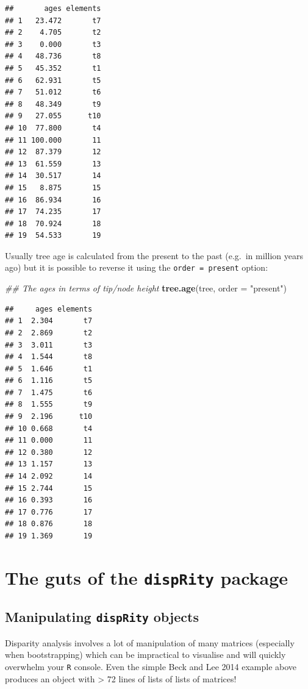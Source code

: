 \documentclass[]{book}
\newenvironment{Shaded}{\begin{snugshade}}{\end{snugshade}}
\newcommand{\CommentTok}[1]{\textcolor[rgb]{0.56,0.35,0.01}{\textit{#1}}}
\newcommand{\DataTypeTok}[1]{\textcolor[rgb]{0.13,0.29,0.53}{#1}}
\newcommand{\KeywordTok}[1]{\textcolor[rgb]{0.13,0.29,0.53}{\textbf{#1}}}
\newcommand{\NormalTok}[1]{#1}
\newcommand{\StringTok}[1]{\textcolor[rgb]{0.31,0.60,0.02}{#1}}
\begin{document}
\begin{verbatim}
##       ages elements
## 1   23.472       t7
## 2    4.705       t2
## 3    0.000       t3
## 4   48.736       t8
## 5   45.352       t1
## 6   62.931       t5
## 7   51.012       t6
## 8   48.349       t9
## 9   27.055      t10
## 10  77.800       t4
## 11 100.000       11
## 12  87.379       12
## 13  61.559       13
## 14  30.517       14
## 15   8.875       15
## 16  86.934       16
## 17  74.235       17
## 18  70.924       18
## 19  54.533       19
\end{verbatim}

Usually tree age is calculated from the present to the past (e.g.~in million years ago) but it is possible to reverse it using the \texttt{order\ =\ present} option:

\begin{Shaded}
\begin{Highlighting}[]
\CommentTok{## The ages in terms of tip/node height}
\KeywordTok{tree.age}\NormalTok{(tree, }\DataTypeTok{order =} \StringTok{"present"}\NormalTok{)}
\end{Highlighting}
\end{Shaded}

\begin{verbatim}
##     ages elements
## 1  2.304       t7
## 2  2.869       t2
## 3  3.011       t3
## 4  1.544       t8
## 5  1.646       t1
## 6  1.116       t5
## 7  1.475       t6
## 8  1.555       t9
## 9  2.196      t10
## 10 0.668       t4
## 11 0.000       11
## 12 0.380       12
## 13 1.157       13
## 14 2.092       14
## 15 2.744       15
## 16 0.393       16
## 17 0.776       17
## 18 0.876       18
## 19 1.369       19
\end{verbatim}

\hypertarget{the-guts-of-the-disprity-package}{%
\chapter{\texorpdfstring{The guts of the \texttt{dispRity} package}{The guts of the dispRity package}}\label{the-guts-of-the-disprity-package}}

\hypertarget{manipulating-disprity-objects}{%
\section{\texorpdfstring{Manipulating \texttt{dispRity} objects}{Manipulating dispRity objects}}\label{manipulating-disprity-objects}}

Disparity analysis involves a lot of manipulation of many matrices (especially when bootstrapping) which can be impractical to visualise and will quickly overwhelm your \texttt{R} console.
Even the simple Beck and Lee 2014 example above produces an object with \textgreater{} 72 lines of lists of lists of matrices!
\end{document}
